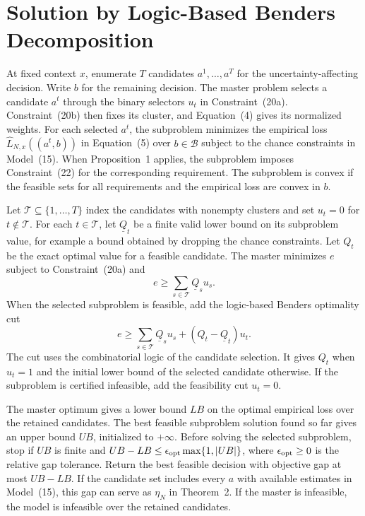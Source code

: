 \section{Solution by Logic-Based Benders Decomposition}\label{BDSF}\label{subsec:logic-benders}

At fixed context \(x\), enumerate \(T\) candidates \(a^1,\ldots,a^T\) for the uncertainty-affecting decision. Write \(b\) for the remaining decision. The master problem selects a candidate \(a^t\) through the binary selectors \(u_t\) in Constraint~\textup{(20a)}. Constraint~\textup{(20b)} then fixes its cluster, and Equation~\textup{(4)} gives its normalized weights. For each selected \(a^t\), the subproblem minimizes the empirical loss \(\widehat L_{N,x}((a^t,b))\) in Equation~\textup{(5)} over \(b\in\mathcal B\) subject to the chance constraints in Model~\textup{(15)}. When Proposition~1 applies, the subproblem imposes Constraint~\textup{(22)} for the corresponding requirement. The subproblem is convex if the feasible sets for all requirements and the empirical loss are convex in \(b\).

Let \(\mathcal T\subseteq\{1,\ldots,T\}\) index the candidates with nonempty clusters and set \(u_t=0\) for \(t\notin\mathcal T\). For each \(t\in\mathcal T\), let \(\underline Q_t\) be a finite valid lower bound on its subproblem value, for example a bound obtained by dropping the chance constraints. Let \(Q_t\) be the exact optimal value for a feasible candidate. The master minimizes \(e\) subject to Constraint~\textup{(20a)} and
\begin{equation}\label{eq:master-lower-bound}
 e\ge\sum_{s\in\mathcal T}\underline Q_su_s.
\end{equation}
When the selected subproblem is feasible, add the logic-based Benders optimality cut \citep{hooker2003logic}
\begin{equation}\label{eq:logic-cut}
 e\ge\sum_{s\in\mathcal T}\underline Q_su_s+(Q_t-\underline Q_t)u_t.
\end{equation}
The cut uses the combinatorial logic of the candidate selection. It gives \(Q_t\) when \(u_t=1\) and the initial lower bound of the selected candidate otherwise. If the subproblem is certified infeasible, add the feasibility cut \(u_t=0\).

The master optimum gives a lower bound \(LB\) on the optimal empirical loss over the retained candidates. The best feasible subproblem solution found so far gives an upper bound \(UB\), initialized to \(+\infty\). Before solving the selected subproblem, stop if \(UB\) is finite and \(UB-LB\le\epsilon_{\rm opt}\max\{1,|UB|\}\), where \(\epsilon_{\rm opt}\ge0\) is the relative gap tolerance. Return the best feasible decision with objective gap at most \(UB-LB\). If the candidate set includes every \(a\) with available estimates in Model~\textup{(15)}, this gap can serve as \(\eta_N\) in Theorem~2. If the master is infeasible, the model is infeasible over the retained candidates.

